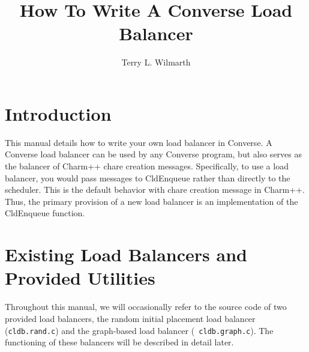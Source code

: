 
\newif\ifpdf
\ifx\pdfoutput\undefined
  \pdffalse
\else
  \pdftrue
\fi

\ifpdf
\else
\fi

\pagestyle{headings}


%
%

%
%
\newcommand{\zap}[1]{ }
\newcommand{\fcmd}{\bf}		%
\newcommand{\fparm}{\it\sf}	%
\newcommand{\fexec}{\bf}	%
\newcommand{\atitle}[1]{{\it #1}}
\newcommand{\keyword}[1]{{\textbf{#1}}}
\newcommand{\userword}[1]{{\fparm \textsc{#1}}}
\newcommand{\constraint}[1]{Note: {\it #1}}
\newcommand{\note}[1]{Note: {\it #1}}

\title{How To Write A Converse Load Balancer}
\author{Terry L. Wilmarth}



\maketitle

\section{Introduction}

This manual details how to write your own load balancer in Converse.
A Converse load balancer can be used by any Converse program, but also
serves as the balancer of Charm++ chare creation messages.
Specifically, to use a load balancer, you would pass messages to
CldEnqueue rather than directly to the scheduler.  This is the default
behavior with chare creation message in Charm++.  Thus, the primary
provision of a new load balancer is an implementation of the
CldEnqueue function.

\section{Existing Load Balancers and Provided Utilities}

Throughout this manual, we will occasionally refer to the source code
of two provided load balancers, the random initial placement load balancer
({\tt cldb.rand.c}) and the graph-based load balancer ({\tt
cldb.graph.c}).  The functioning of these balancers will be described
in detail later.

